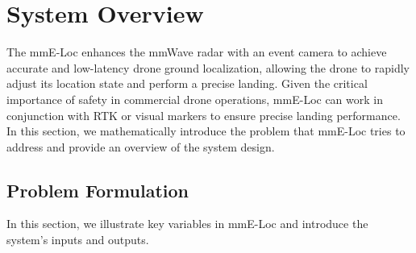 \section{System Overview}
The mmE-Loc enhances the mmWave radar with an event camera to achieve accurate and low-latency drone ground localization, allowing the drone to rapidly adjust its location state and perform a precise landing.
Given the critical importance of safety in commercial drone operations, mmE-Loc can work in conjunction with RTK or visual markers to ensure precise landing performance.
In this section, we mathematically introduce the problem that mmE-Loc tries to address and provide an overview of the system design.



\vspace{-0.3cm}
\subsection{Problem Formulation}
In this section, we illustrate key variables in mmE-Loc and introduce the system's inputs and outputs.


